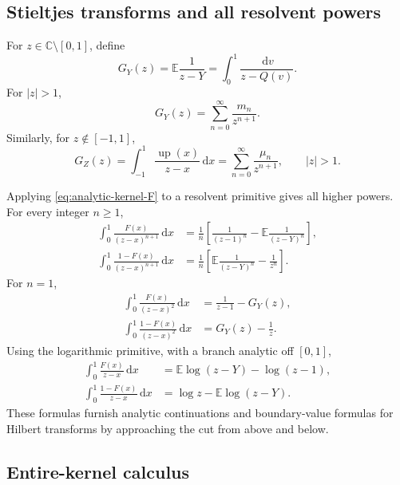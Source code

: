 \documentclass[11pt,oneside]{article}
\theoremstyle{definition}
\newcommand{\F}{F}
\newcommand{\Q}{Q}
\newcommand{\upf}{\operatorname{up}}
\newcommand{\E}{\mathbb E}
\newcommand{\C}{\mathbb C}
\newcommand{\dd}{\,\mathrm d}
\begin{document}
\subsection{Stieltjes transforms and all resolvent powers}

For \(z\in\C\setminus[0,1]\), define
\begin{equation}\label{eq:GY-def}
 G_Y(z)=\E\frac1{z-Y}
 =\int_0^1\frac{\dd v}{z-\Q(v)}.
\end{equation}
For \(|z|>1\),
\begin{equation}\label{eq:GY-moment-series}
 G_Y(z)=\sum_{n=0}^{\infty}\frac{m_n}{z^{n+1}}.
\end{equation}
Similarly, for \(z\notin[-1,1]\),
\begin{equation}\label{eq:GZ-def}
 G_Z(z)=\int_{-1}^1\frac{\upf(x)}{z-x}\dd x
 =\sum_{n=0}^{\infty}\frac{\mu_n}{z^{n+1}},
 \qquad |z|>1.
\end{equation}

Applying \cref{eq:analytic-kernel-F} to a resolvent primitive gives all higher powers.
For every integer \(n\ge1\),
\begin{align}
 \int_0^1\frac{\F(x)}{(z-x)^{n+1}}\dd x
 &=\frac1n\left[\frac1{(z-1)^n}-\E\frac1{(z-Y)^n}\right],
 \label{eq:resolvent-F-n}\\
 \int_0^1\frac{1-\F(x)}{(z-x)^{n+1}}\dd x
 &=\frac1n\left[\E\frac1{(z-Y)^n}-\frac1{z^n}\right].
 \label{eq:resolvent-up-n}
\end{align}
For \(n=1\),
\begin{align}
 \int_0^1\frac{\F(x)}{(z-x)^2}\dd x
 &=\frac1{z-1}-G_Y(z),\label{eq:resolvent-F-2}\\
 \int_0^1\frac{1-\F(x)}{(z-x)^2}\dd x
 &=G_Y(z)-\frac1z.\label{eq:resolvent-up-2}
\end{align}
Using the logarithmic primitive, with a branch analytic off \([0,1]\),
\begin{align}
 \int_0^1\frac{\F(x)}{z-x}\dd x
 &=\E\log(z-Y)-\log(z-1),
 \label{eq:log-resolvent-F}\\
 \int_0^1\frac{1-\F(x)}{z-x}\dd x
 &=\log z-\E\log(z-Y).
 \label{eq:log-resolvent-up}
\end{align}
These formulas furnish analytic continuations and boundary-value formulas for Hilbert
transforms by approaching the cut from above and below.

\subsection{Entire-kernel calculus}
\end{document}
